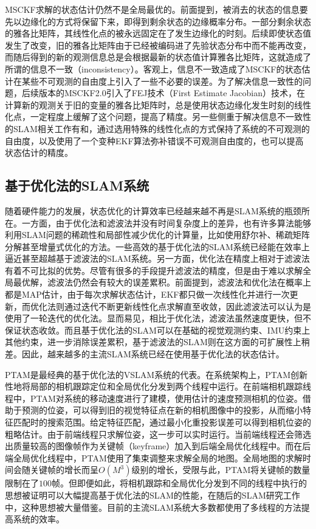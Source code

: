 MSCKF求解的状态估计仍然不是全局最优的。前面提到，被消去的状态的信息要先以边缘化的方式将保留下来，即得到剩余状态的边缘概率分布。一部分剩余状态的雅各比矩阵，其线性化点的被永远固定在了发生边缘化的时刻。后续即使状态值发生了改变，旧的雅各比矩阵由于已经被编码进了先验状态分布中而不能再改变，而随后得到的新的观测信息总是会根据最新的状态值计算雅各比矩阵，这就造成了所谓的信息不一致（inconsistency）。客观上，信息不一致造成了MSCKF的状态估计在某些不可观测的自由度上引入了一些不必要的误差。为了解决信息一致性的问题，后续版本的MSCKF2.0\citep{li2012improving}引入了FEJ技术（First Estimate Jacobian）技术\citep{huang2008analysis}，在计算新的观测关于旧的变量的雅各比矩阵时，总是使用状态边缘化发生时刻的线性化点，一定程度上缓解了这个问题，提高了精度。另一些侧重于解决信息不一致性的SLAM相关工作有\citep{huang2011observability}和\citep{huang2013quadratic}，通过选用特殊的线性化点的方式保持了系统的不可观测的自由度，以及使用了一个变种EKF算法弥补错误不可观测自由度的\citep{barrau2015ekf}，也可以提高状态估计的精度。

\subsection{基于优化法的SLAM系统}

随着硬件能力的发展，状态优化的计算效率已经越来越不再是SLAM系统的瓶颈所在。一方面，由于优化法和滤波法并没有时间复杂度上的差异，也有许多算法能够利用SLAM问题的稀疏性和局部性减少优化的计算量，比如使用舒尔补、稀疏矩阵分解甚至增量式优化的方法。一些高效的基于优化法的SLAM系统已经能在效率上逼近甚至超越基于滤波法的SLAM系统。另一方面，优化法在精度上相对于滤波法有着不可比拟的优势。尽管有很多的手段提升滤波法的精度，但是由于难以求解全局最优解，滤波法仍然会有较大的误差累积。前面提到，滤波法和优化法在概率上都是MAP估计，由于每次求解状态估计，EKF都只做一次线性化并进行一次更新，而优化法则通过迭代不断更新线性化点求解直至收敛，因此滤波法可以认为是使用了一轮迭代的优化法。显而易见，相比于优化法，滤波法虽然速度更快，但不保证状态收敛。而且基于优化法的SLAM可以在基础的视觉观测约束、IMU约束上其他约束，进一步消除误差累积，基于滤波法的SLAM则在这方面的可扩展性上稍差。因此，越来越多的主流SLAM系统已经在使用基于优化法的状态估计。

PTAM\citep{klein2007parallel}是最经典的基于优化法的VSLAM系统的代表。在系统架构上，PTAM创新性地将局部的相机跟踪定位和全局优化分发到两个线程中运行。在前端相机跟踪线程中，PTAM对系统的移动速度进行了建模，使用估计的速度预测相机的位姿。借助于预测的位姿，可以得到旧的视觉特征点在新的相机图像中的投影，从而缩小特征匹配时的搜索范围。给定特征匹配，通过最小化重投影误差可以得到相机位姿的粗略估计。由于前端线程只求解位姿，这一步可以实时运行。当前端线程还会筛选出质量较高的图像帧作为关键帧（keyframe）加入到后端全局优化线程中。而在后端全局优化线程中，PTAM使用了集束调整来求解全局的地图。全局地图的求解时间会随关键帧的增长而呈$O(M^3)$级别的增长，受限与此，PTAM将关键帧的数量限制在了$100$帧。但即便如此，将相机跟踪和全局优化分发到不同的线程中执行的思想被证明可以大幅提高基于优化法的SLAM的性能，在随后的SLAM研究工作中，这种思想被大量借鉴。目前的主流SLAM系统大多数都使用了多线程的方法提高系统的效率。

